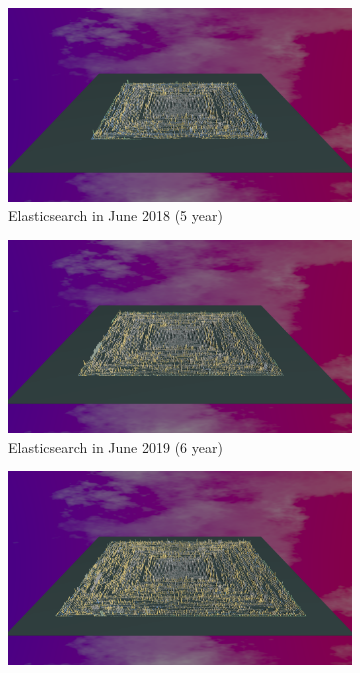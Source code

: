 \begin{figure}[ht]
\begin{subfigure}{0.48\textwidth}
        \includegraphics[width=\linewidth]{Elasticsearch/Animation005.png}
        \caption{Elasticsearch in June 2018 (5 year)} 
        \label{fig:Elastic_V5_S3}
    \end{subfigure}\hspace*{\fill}
    \begin{subfigure}{0.48\textwidth}
        \includegraphics[width=\linewidth]{Elasticsearch/Animation006.png}
        \caption{Elasticsearch in June 2019  (6 year)} 
        \label{fig:Elastic_V5_S4}
    \end{subfigure}
    \medskip
    \begin{subfigure}{0.48\textwidth}
        \includegraphics[width=\linewidth]{Elasticsearch/Animation008.png}

\end{subfigure}
\end{figure}
